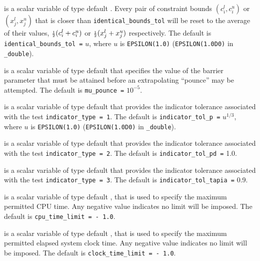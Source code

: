 \begin{description}
is a scalar variable of type default \realdp.
Every pair of constraint bounds
$(c_{i}^{l}, c_{i}^{u})$ or $(x_{j}^{l}, x_{j}^{u})$
that is closer than {\tt identical\_bounds\_tol}
will be reset to the average of their values,
${\scriptstyle \frac{1}{2}} (c_{i}^{l} + c_{i}^{u})$ or ${\scriptstyle \frac{1}{2}} (x_{j}^{l} + x_{j}^{u})$
respectively.
The default is {\tt identical\_bounds\_tol =} $u$,
where $u$ is {\tt EPSILON(1.0)} ({\tt EPSILON(1.0D0)} in
{\tt \fullpackagename\_double}).

is a scalar variable of type default \realdp that specifies
the value of the barrier parameter that must be attained before an 
extrapolating ``pounce'' may be attempted.
The default is {\tt mu\_pounce =} $10^{-5}$.

is a scalar variable of type default \realdp that
provides the indicator tolerance associated with the test
{\tt indicator\_type = 1}.
The default is {\tt indicator\_tol\_p =} $u^{1/3}$,
where $u$ is {\tt EPSILON(1.0)} ({\tt EPSILON(1.0D0)} in
{\tt \fullpackagename\_double}).

is a scalar variable of type default \realdp that
provides the indicator tolerance associated with the test
{\tt indicator\_type = 2}.
The default is {\tt indicator\_tol\_pd =} 1.0.

is a scalar variable of type default \realdp that
provides the indicator tolerance associated with the test
{\tt indicator\_type = 3}.
The default is {\tt indicator\_tol\-\_tapia =} 0.9.

 is a scalar variable of type default \realdp,
that is used to specify the maximum permitted CPU time. Any negative
value indicates no limit will be imposed. The default is
{\tt cpu\_time\_limit = - 1.0}.

 is a scalar variable of type default \realdp,
that is used to specify the maximum permitted elapsed system clock time.
Any negative value indicates no limit will be imposed. The default is
{\tt clock\_time\_limit = - 1.0}.



\end{description}

